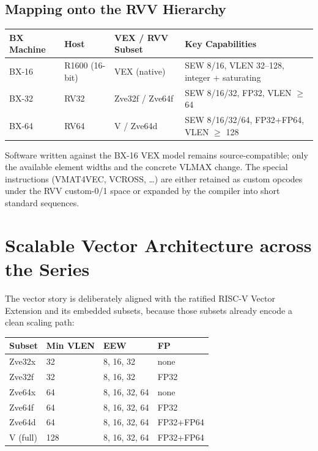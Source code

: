 \documentclass[11pt,a4paper]{article}
\begin{document}
\subsection{Mapping onto the RVV Hierarchy}

\begin{center}
\begin{tabular}{@{}llll@{}}
\toprule
\textbf{BX Machine} & \textbf{Host} & \textbf{VEX / RVV Subset} & \textbf{Key Capabilities} \\
\midrule
BX-16 & R1600 (16-bit) & VEX (native) & SEW 8/16, VLEN 32--128, integer + saturating \\
BX-32 & RV32 & Zve32f / Zve64f & SEW 8/16/32, FP32, VLEN $\ge$ 64 \\
BX-64 & RV64 & V / Zve64d & SEW 8/16/32/64, FP32+FP64, VLEN $\ge$ 128 \\
\bottomrule
\end{tabular}
\end{center}

Software written against the BX-16 VEX model remains source-compatible; only the available element widths and the concrete VLMAX change. The special instructions (VMAT4VEC, VCROSS, \ldots) are either retained as custom opcodes under the RVV custom-0/1 space or expanded by the compiler into short standard sequences.

\section{Scalable Vector Architecture across the Series}

The vector story is deliberately aligned with the ratified RISC-V Vector Extension and its embedded subsets, because those subsets already encode a clean scaling path:

\begin{center}
\begin{tabular}{@{}llll@{}}
\toprule
\textbf{Subset} & \textbf{Min VLEN} & \textbf{EEW} & \textbf{FP} \\
\midrule
Zve32x  & 32  & 8, 16, 32     & none \\
Zve32f  & 32  & 8, 16, 32     & FP32 \\
Zve64x  & 64  & 8, 16, 32, 64 & none \\
Zve64f  & 64  & 8, 16, 32, 64 & FP32 \\
Zve64d  & 64  & 8, 16, 32, 64 & FP32+FP64 \\
V (full)& 128 & 8, 16, 32, 64 & FP32+FP64 \\
\bottomrule
\end{tabular}
\end{center}
\end{document}
